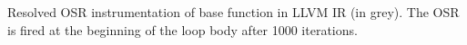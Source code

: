 \label{fig:isordfrom} Resolved OSR instrumentation of base function in LLVM IR (in grey). The OSR is fired at the beginning of the loop body after 1000 iterations.
